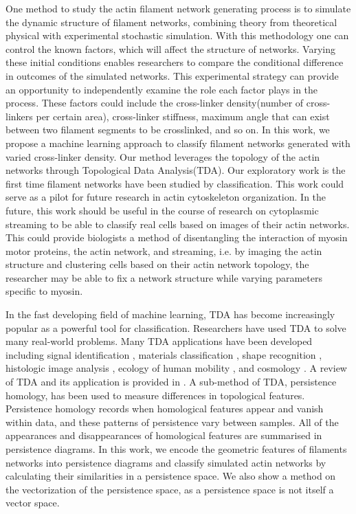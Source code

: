 \documentclass[10pt]{article}
\begin{document}
One method to study the actin filament network generating process is to simulate the dynamic structure of filament networks, combining theory from theoretical physical with experimental stochastic simulation. With this methodology one can control the known factors, which will affect the structure of networks. Varying these initial conditions enables researchers to compare the conditional difference in outcomes of the simulated networks. This experimental strategy can provide an opportunity to independently examine the role each factor plays in the process. These factors could include the cross-linker density(number of cross-linkers per certain area), cross-linker stiffness, maximum angle that can exist between two filament segments to be crosslinked, and so on\cite{freedman2017versatile,freedman2018nonequilibrium}. In this work, we propose a machine learning approach to classify filament networks generated with varied cross-linker density. Our method leverages the topology of the actin networks through Topological Data Analysis(TDA). Our exploratory work is the first time filament networks have been studied by classification. This work could serve as a pilot for future research in actin cytoskeleton organization. In the future, this work should be useful in the course of research on cytoplasmic streaming to be able to classify real cells based on images of their actin networks. This could provide biologists a method of disentangling the interaction of myosin motor proteins, the actin network, and streaming, i.e. by imaging the actin structure and clustering cells based on their actin network topology, the researcher may be able to fix a network structure while varying parameters specific to myosin.

In the fast developing field of machine learning, TDA has become increasingly popular as a powerful tool for classification. Researchers have used TDA to solve many real-world problems. Many TDA applications have been developed including signal identification \cite{marchese2016topological}, materials classification \cite{hiraoka2016hierarchical,maroulas2019bayesian}, shape recognition \cite{bonis2016persistence,li2014persistence}, histologic image analysis \cite{belchi2018lung,nicolau2011topology,singh2014topological}, ecology of human mobility \cite{chen2017measuring,chen2019generalized}, and cosmology \cite{sousbie2011persistent,van2010alpha}. A review of TDA and its application is provided in \cite{wasserman2018topological}. A sub-method of TDA, persistence homology, has been used to measure differences in topological features. Persistence homology records when homological features appear and vanish within data, and these patterns of persistence vary between samples. All of the appearances and disappearances of homological features are summarised in persistence diagrams. In this work, we encode the geometric features of filaments networks into persistence diagrams and classify simulated actin networks by calculating their similarities in a persistence space. We also show a method on the vectorization of the persistence space, as a persistence space is not itself a vector space.
\end{document}
